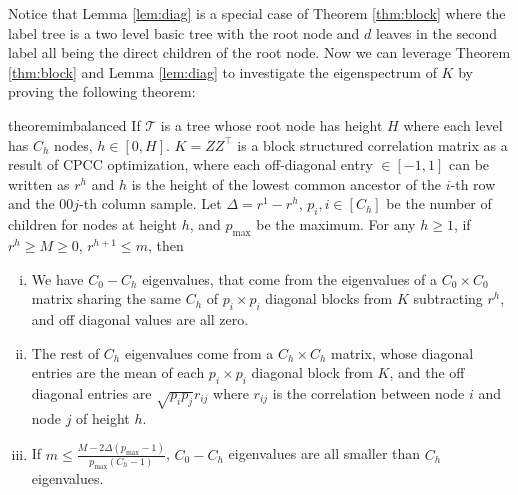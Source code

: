 Notice that Lemma \ref{lem:diag} is a special case of Theorem \ref{thm:block} where the label tree is a two level basic tree with the root node and $d$ leaves in the second label all being the direct children of the root node. Now we can leverage Theorem \ref{thm:block} and Lemma \ref{lem:diag} to investigate the eigenspectrum of $K$ by proving the following theorem:

\begin{restatable}{theorem}{imbalanced}
    \label{thm:eigen-generic} 
    If $\mathcal{T}$ is a tree whose root node has height $H$ where each level has $C_h$ nodes, $h \in [0,H]$. $K = ZZ^\top$ is a block structured correlation matrix as a result of CPCC optimization, where each off-diagonal entry $\in [-1,1]$ can be written as $r^h$ and $h$ is the height of the lowest common ancestor of the $i$-th row and the 00$j$-th column sample. Let $\Delta = r^1 - r^h$, $p_i, i \in [C_h]$ be the number of children for nodes at height $h$, and $p_\text{max}$ be the maximum. For any $h \geq 1$, if $r^h \geq M \geq 0$, $r^{h+1} \leq m$, then 
    \begin{enumerate}[(i)]
        \item We have $C_0 - C_h$ eigenvalues, that come from the eigenvalues of a $C_0 \times C_0$ matrix sharing the same $C_h$ of $p_i \times p_i$ diagonal blocks from $K$ subtracting $r^h$, and off diagonal values are all zero.
        \item The rest of $C_h$ eigenvalues come from a $C_h \times C_h$ matrix, whose diagonal entries are the mean of each $p_i \times p_i$ diagonal block from $K$, and the off diagonal entries are $\sqrt{p_ip_j}r_{ij}$ where $r_{ij}$ is the correlation between node $i$ and node $j$ of height $h$.
        \item If $m \leq \frac{M - 2\Delta(p_\text{max} - 1)}{p_\text{max}(C_h-1)}$, $C_0 - C_h$ eigenvalues are all smaller than $C_h$ eigenvalues.
    \end{enumerate}
\end{restatable}

